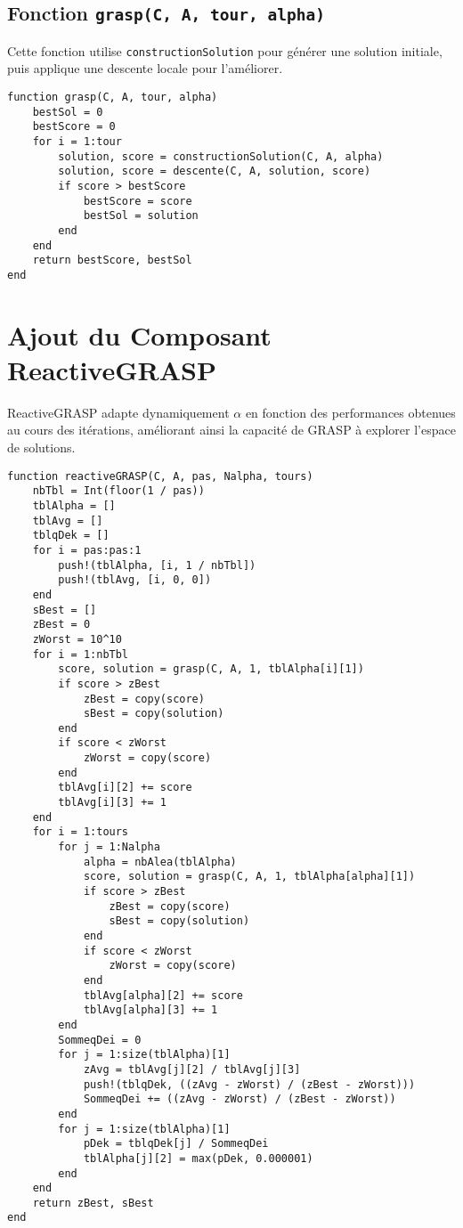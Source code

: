 \begin{minipage}
\subsection*{Fonction \texttt{grasp(C, A, tour, alpha)}}
Cette fonction utilise \texttt{constructionSolution} pour générer une solution initiale, puis applique une descente locale pour l'améliorer.

\begin{lstlisting}
function grasp(C, A, tour, alpha)
    bestSol = 0
    bestScore = 0
    for i = 1:tour
        solution, score = constructionSolution(C, A, alpha)
        solution, score = descente(C, A, solution, score)
        if score > bestScore
            bestScore = score
            bestSol = solution
        end
    end
    return bestScore, bestSol
end
\end{lstlisting}

\section*{Ajout du Composant ReactiveGRASP}
ReactiveGRASP adapte dynamiquement $\alpha$ en fonction des performances obtenues au cours des itérations, améliorant ainsi la capacité de GRASP à explorer l’espace de solutions.

\begin{lstlisting}
function reactiveGRASP(C, A, pas, Nalpha, tours)
    nbTbl = Int(floor(1 / pas))
    tblAlpha = []
    tblAvg = []
    tblqDek = []
    for i = pas:pas:1
        push!(tblAlpha, [i, 1 / nbTbl])
        push!(tblAvg, [i, 0, 0])
    end
    sBest = []
    zBest = 0
    zWorst = 10^10
    for i = 1:nbTbl
        score, solution = grasp(C, A, 1, tblAlpha[i][1])
        if score > zBest
            zBest = copy(score)
            sBest = copy(solution)
        end
        if score < zWorst
            zWorst = copy(score)
        end
        tblAvg[i][2] += score
        tblAvg[i][3] += 1
    end
    for i = 1:tours
        for j = 1:Nalpha
            alpha = nbAlea(tblAlpha)
            score, solution = grasp(C, A, 1, tblAlpha[alpha][1])
            if score > zBest
                zBest = copy(score)
                sBest = copy(solution)
            end
            if score < zWorst
                zWorst = copy(score)
            end
            tblAvg[alpha][2] += score
            tblAvg[alpha][3] += 1
        end
        SommeqDei = 0
        for j = 1:size(tblAlpha)[1]
            zAvg = tblAvg[j][2] / tblAvg[j][3]
            push!(tblqDek, ((zAvg - zWorst) / (zBest - zWorst)))
            SommeqDei += ((zAvg - zWorst) / (zBest - zWorst))
        end
        for j = 1:size(tblAlpha)[1]
            pDek = tblqDek[j] / SommeqDei
            tblAlpha[j][2] = max(pDek, 0.000001)
        end
    end
    return zBest, sBest
end
\end{lstlisting}



\end{minipage}
